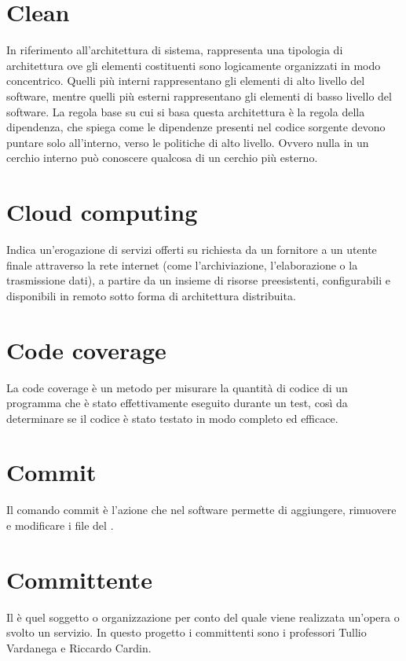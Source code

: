 \section{Clean}\label{sec:Clean Architecture}
In riferimento all'architettura di sistema, rappresenta una tipologia di architettura ove gli elementi costituenti sono logicamente organizzati in modo concentrico. Quelli più interni rappresentano gli elementi di alto livello del software, mentre quelli più esterni rappresentano gli elementi di basso livello del software. La regola base su cui si basa questa architettura è la regola della dipendenza, che spiega come le dipendenze presenti nel codice sorgente devono puntare solo all'interno, verso le politiche di alto livello. Ovvero nulla in un cerchio interno può conoscere qualcosa di un cerchio più esterno.

\section{Cloud computing}\label{sec:Cloud}
Indica un'erogazione di servizi offerti su richiesta da un fornitore a un utente finale attraverso la rete internet (come l'archiviazione, l'elaborazione o la trasmissione dati), a partire da un insieme di risorse preesistenti, configurabili e disponibili in remoto sotto forma di architettura distribuita.

\section{Code coverage}
La code coverage è un metodo per misurare la quantità di codice di un programma che è stato effettivamente eseguito durante un test, così da determinare se il codice è stato testato in modo completo ed efficace.

\section{Commit}\label{sec:Commits}
Il comando commit è l'azione che nel software  permette di aggiungere, rimuovere e modificare i file del .

\section{Committente}\label{sec:Committenti}
Il  è quel soggetto o organizzazione per conto del quale viene realizzata un'opera o svolto un servizio. In questo progetto i committenti sono i professori Tullio Vardanega e Riccardo Cardin.

